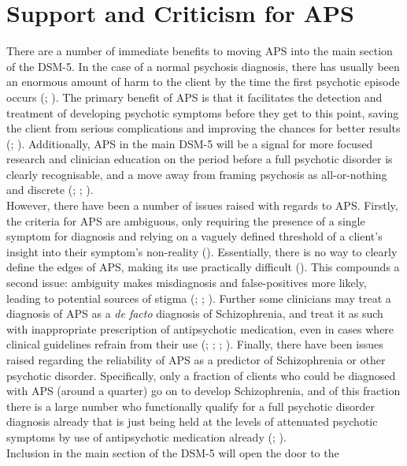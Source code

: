 \documentclass[stu,a4paper,12pt,donotrepeattitle]{apa7}
\begin{document}
\section{Support and Criticism for APS}
There are a number of immediate benefits to moving APS into the main section of
the DSM-5. In the case of a normal psychosis diagnosis, there has usually been
an enormous amount of harm to the client by the time the first psychotic
episode occurs (\cite{carp20}; \cite{zachetal20}). The primary benefit of APS
is that it facilitates the detection and treatment of developing psychotic
symptoms before they get to this point, saving the client from serious
complications and improving the chances for better results (\cite{carp20};
\cite{zachetal20}). Additionally, APS in the main DSM-5 will be a signal for
more focused research and clinician education on the period before a full
psychotic disorder is clearly recognisable, and a move away from framing
psychosis as all-or-nothing and discrete (\cite{carp20}; \cite{corcetal21};
\cite{zachetal20}).\\
However, there have been a number of issues raised with regards to APS.
Firstly, the criteria for APS are ambiguous, only requiring the presence of a
single symptom for diagnosis and relying on a vaguely defined threshold of a
client's insight into their symptom's non-reality (\cite{mahbell19b}).
Essentially, there is no way to clearly define the edges of APS, making its
use practically difficult (\cite{mahbell19b}). This compounds a second issue:
ambiguity makes misdiagnosis and false-positives more likely, leading to
potential sources of stigma (\cite{corcetal21}; \cite{mahbell19b};
\cite{zachetal20}). Further some clinicians may treat a diagnosis of APS as a
\textit{de facto} diagnosis of Schizophrenia, and treat it as such with
inappropriate prescription of antipsychotic medication, even in cases where
clinical guidelines refrain from their use (\cite{carp20}; \cite{corcetal21};
\cite{mahbell19b}; \cite{zachetal20}). Finally, there have been issues raised
regarding the reliability of APS as a predictor of Schizophrenia or other
psychotic disorder. Specifically, only a fraction of clients who could be
diagnosed with APS (around a quarter) go on to develop Schizophrenia, and of this
fraction there is a large number who functionally qualify for a full psychotic
disorder diagnosis already that is just being held at the levels of attenuated
psychotic symptoms by use of antipsychotic medication already (\cite{mahbell19b};
\cite{rabetal20}).\\
Inclusion in the main section of the DSM-5 will open the door to the
\end{document}
